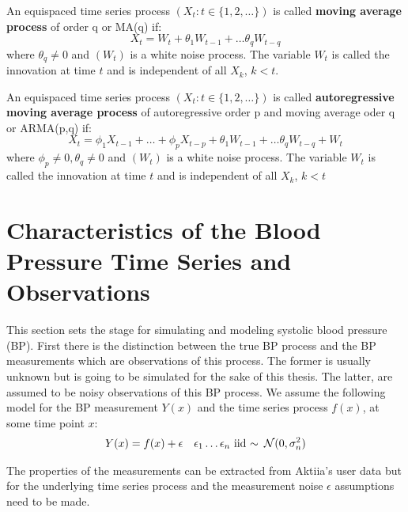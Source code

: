 \begin{example}
    An equispaced time series process $(X_t: t \in \{1,2, \dots\})$ is called \textbf{moving average process}
    of order q or MA(q) if:
    \[
        X_t = W_t + \theta_1 W_{t-1} + \dots \theta_q W_{t-q}
    \]
    where $\theta_q \neq 0$ and $(W_t)$ is a white noise process.
    The variable $W_t$ is called the innovation at time $t$ and is independent of all $X_k$, $k < t$.
\end{example}


\begin{example}
    An equispaced time series process $(X_t: t \in \{1,2, \dots\})$ is called \textbf{autoregressive moving average process}
    of autoregressive order p and moving average oder q or ARMA(p,q) if:
    \[
        X_t =  \phi_1 X_{t-1} + \dots + \phi_p X_{t-p} + \theta_1 W_{t-1} + \dots \theta_q W_{t-q} + W_t
    \]
    where $\phi_p \neq 0, \theta_q \neq 0$ and $(W_t)$ is a white noise process.
    The variable $W_t$ is called the innovation at time $t$ and is independent of all $X_k$, $k < t$

\end{example}




\section{Characteristics of the Blood Pressure Time Series and Observations}\label{sec:characteristics-of-the-blood-pressure-time-series}

This section sets the stage for simulating and modeling systolic blood pressure (BP).
First there is the distinction between the
true BP process and the BP measurements which are observations of this process.
The former is usually unknown but is going to be simulated for the sake of this thesis.
The latter, are assumed to be noisy observations of this BP process.
We assume the following model for the BP measurement $Y(x)$
and the time series process $f(x)$, at some time point $x$:
\begin{align*}
    Y(x) = f(x) + \epsilon && \epsilon_1 \dots \epsilon_n \text{ iid }{\sim} \text{ } \operatorname{\mathcal{N}}(0, \sigma_n^{2})
\end{align*}

The properties of the measurements can be extracted from Aktiia's
user data but for the underlying time series process and the measurement noise
$\epsilon$ assumptions need to be made.


